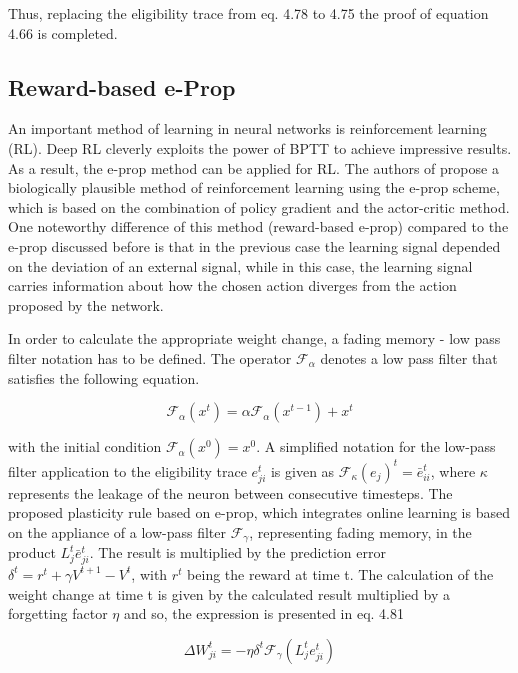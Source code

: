 \documentclass[12pt]{report}
\begin{document}
Thus, replacing the eligibility trace from eq. 4.78 to 4.75 the proof of equation 4.66 is completed.

\subsection{Reward-based e-Prop}

An important method of learning in neural networks is reinforcement learning (RL). Deep RL cleverly exploits the power of BPTT to achieve impressive results. As a result, the e-prop method can be applied for RL. The authors of \cite{Bellec2020} propose a biologically plausible method of reinforcement learning using the e-prop scheme, which is based on the combination of policy gradient and the actor-critic method. One noteworthy difference of this method (reward-based e-prop) compared to the e-prop discussed before is that in the previous case the learning signal depended on the deviation of an external signal, while in this case, the learning signal carries information about how the chosen action diverges from the action proposed by the network.

In order to calculate the appropriate weight change, a fading memory - low pass filter notation has to be defined. The operator \(\mathcal{F}_\alpha\) denotes a low pass filter that satisfies the following equation.

\begin{equation}
    \mathcal{F}_{\alpha}\left(x^{t}\right)=\alpha \mathcal{F}_{\alpha}\left(x^{t-1}\right)+x^{t}
\end{equation}

with the initial condition \(\mathcal{F}_{\alpha}\left(x^{0}\right)=x^{0}\). A simplified notation for the low-pass filter application to the eligibility trace \(e_{ji}^t\) is given as $\mathcal{F}_{\kappa} \left(e_{j}\right)^{t}=\bar{e}_{i i}^{t}$, where \(\kappa\) represents the leakage of the neuron between consecutive timesteps. The proposed plasticity rule based on e-prop, which integrates online learning is based on the appliance of a low-pass filter $\mathcal{F}_{\gamma}$, representing fading memory, in the product \(L_j^t\bar{e}_{ji}^t\). The result is multiplied by the prediction error $\delta^{t}=r^{t}+\gamma V^{t+1}-V^{t}$, with $r^t$ being the reward at time t. The calculation of the weight change at time t is given by the calculated result multiplied by a forgetting factor $\eta$ and so, the expression is presented in eq. 4.81

\begin{equation}
    \Delta W_{j i}^{t}=-\eta \delta^{t} \mathcal{F}_{\gamma}\left(L_{j}^{t} e_{j i}^{t}\right)
\end{equation}
\end{document}
